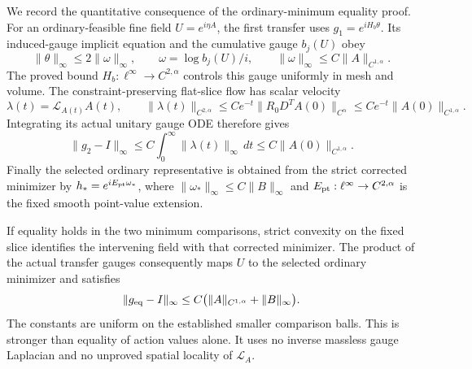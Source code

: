 \documentclass[11pt]{article}
\theoremstyle{remark}
\begin{document}
We record the quantitative consequence of the ordinary-minimum equality
proof. For an ordinary-feasible fine field $U=e^{i\eta A}$, the first
transfer uses $g_1=e^{iH_b\theta}$. Its induced-gauge implicit equation
and the cumulative gauge $b_j(U)$ obey
\begin{equation}
 \|\theta\|_\infty\le2\|\omega\|_\infty,\qquad
 \omega=\log b_j(U)/i,\qquad
 \|\omega\|_\infty\le C\|A\|_{C^{1,\alpha}}.
 \label{csgq-first-transfer}
\end{equation}
The proved bound $H_b:\ell^\infty\to C^{2,\alpha}$ controls this gauge
uniformly in mesh and volume. The constraint-preserving flat-slice flow
has scalar velocity
\begin{equation}
 \lambda(t)=\mathcal L_{A(t)}A(t),\qquad
 \|\lambda(t)\|_{C^{2,\alpha}}
 \le C e^{-t}\|R_0D^T A(0)\|_{C^\alpha}
 \le C e^{-t}\|A(0)\|_{C^{1,\alpha}}.
 \label{csgq-flow}
\end{equation}
Integrating its actual unitary gauge ODE therefore gives
\begin{equation}
 \|g_2-I\|_\infty
 \le C\int_0^\infty\|\lambda(t)\|_\infty\,dt
 \le C\|A(0)\|_{C^{1,\alpha}}.
 \label{csgq-integrated-gauge}
\end{equation}
Finally the selected ordinary representative is obtained from the
strict corrected minimizer by
$h_*=e^{iE_{\rm pt}\omega_*}$, where
$\|\omega_*\|_\infty\le C\|B\|_\infty$ and
$E_{\rm pt}:\ell^\infty\to C^{2,\alpha}$ is the fixed smooth
point-value extension.

If equality holds in the two minimum comparisons, strict convexity on
the fixed slice identifies the intervening field with that corrected
minimizer. The product of the actual transfer gauges consequently maps
$U$ to the selected ordinary minimizer and satisfies
\begin{equation}
 \|g_{\rm eq}-I\|_\infty
       \le C\bigl(\|A\|_{C^{1,\alpha}}+\|B\|_\infty\bigr).
 \label{csgq-equality-gauge}
\end{equation}
The constants are uniform on the established smaller comparison balls.
This is stronger than equality of action values alone. It uses no
inverse massless gauge Laplacian and no unproved spatial locality of
$\mathcal L_A$.
\end{document}
